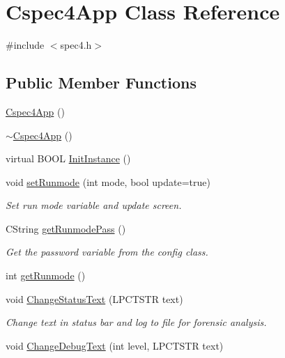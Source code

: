 \hypertarget{classCspec4App}{
\section{Cspec4App Class Reference}
\label{classCspec4App}
}


{\ttfamily \#include $<$spec4.h$>$}

\subsection*{Public Member Functions}
\begin{DoxyCompactItemize}
\item 
\hyperlink{classCspec4App_a2d6f06c3d0aa74241f8b0b73f5a540e0}{Cspec4App} ()
\item 
\hyperlink{classCspec4App_a9742a6aa3bbc1d7ac58c428483eb1e16}{$\sim$Cspec4App} ()
\item 
virtual BOOL \hyperlink{classCspec4App_a160b37e41d99fdce785ebb5b49f87c5a}{InitInstance} ()
\item 
void \hyperlink{classCspec4App_a5b7dc63813b9adc8618efc4c772feb38}{setRunmode} (int mode, bool update=true)
\begin{DoxyCompactList}\small\item\em Set run mode variable and update screen. \item\end{DoxyCompactList}\item 
CString \hyperlink{classCspec4App_a1ee05af5f1e9df03587698237238101f}{getRunmodePass} ()
\begin{DoxyCompactList}\small\item\em Get the password variable from the config class. \item\end{DoxyCompactList}\item 
int \hyperlink{classCspec4App_a506cb76e9dccb47d0d9923af23130bdd}{getRunmode} ()
\item 
void \hyperlink{classCspec4App_a52172be1c5e8090af5655a8a0d1d56e3}{ChangeStatusText} (LPCTSTR text)
\begin{DoxyCompactList}\small\item\em Change text in status bar and log to file for forensic analysis. \item\end{DoxyCompactList}\item 
void \hyperlink{classCspec4App_a7c4c8d3171da52cfb7259fba43cd4c53}{ChangeDebugText} (int level, LPCTSTR text)
\item 

\end{DoxyCompactItemize}
